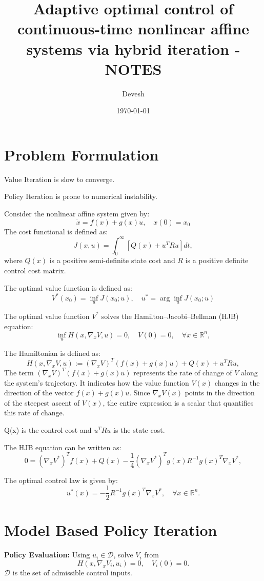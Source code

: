 \documentclass[12pt]{article}
\title{Adaptive optimal control of continuous-time nonlinear affine systems
via hybrid iteration - NOTES}
\author{Devesh}
\date{\today}
\begin{document}
\maketitle

\section{Problem Formulation}
Value Iteration is slow to converge.

Policy Iteration is prone to numerical instability.

Consider the nonlinear affine system given by:
\[
\dot{x} = f(x) + g(x)u, \quad x(0) = x_0
\]
The cost functional is defined as:
\[
J(x, u) = \int_0^{\infty} \left[ Q(x) + u^T R u \right] dt,
\]
where \( Q(x) \) is a positive semi-definite state cost and \( R \) is a positive definite control cost matrix.

The optimal value function is defined as:
\[
V^*(x_0) = \inf_u J(x_0; u), \quad u^* = \arg \inf_u J(x_0; u)
\]

The optimal value function \( V^* \) solves the Hamilton–Jacobi–Bellman (HJB) equation:
\[
\inf_u H(x, \nabla_x V, u) = 0, \quad V(0) = 0, \quad \forall x \in \mathbb{R}^n,
\]

The Hamiltonian is defined as:
\[
H(x, \nabla_x V, u) := (\nabla_x V)^T (f(x) + g(x)u) + Q(x) + u^T R u,
\]
The term \((\nabla_x V)^T (f(x) + g(x)u)\) represents the rate of change of \(V\) along the system's trajectory. It indicates how the value function \(V(x)\) changes in the direction of the vector \(f(x) + g(x)u\). Since \(\nabla_x V(x)\) points in the direction of the steepest ascent of \(V(x)\), the entire expression is a scalar that quantifies this rate of change.

Q(x) is the control cost and \(u^T R u\) is the state cost.

The HJB equation can be written as:
\[
0 = (\nabla_x V^*)^T f(x) + Q(x) - \frac{1}{4} (\nabla_x V^*)^T g(x) R^{-1} g(x)^T \nabla_x V^*,
\]

The optimal control law is given by:
\[
u^*(x) = -\frac{1}{2} R^{-1} g(x)^T \nabla_x V^*, \quad \forall x \in \mathbb{R}^n.
\]

\section{Model Based Policy Iteration}

\textbf{Policy Evaluation:} Using \( u_i \in \mathcal{D} \), solve \( V_i \) from
\[
H(x, \nabla_x V_i, u_i) = 0, \quad V_i(0) = 0.
\]
\(\mathcal{D}\) is the set of admissible control inputs.
\end{document}

